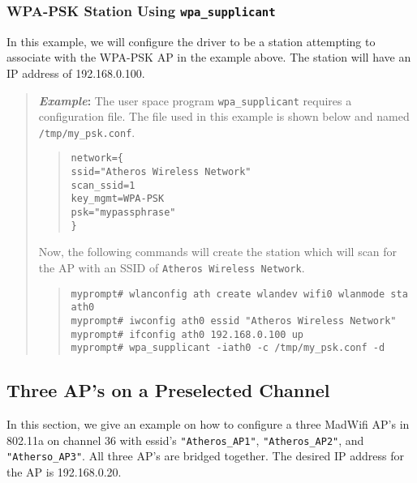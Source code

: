 \documentclass[10pt,fullpage]{article}
\newcommand{\mytt}[1]{{\texttt{#1}}}
\newcommand{\bv}{\begin{verse}}
\newcommand{\ev}{\end{verse}}
\newcommand{\cmd}[1]{{\texttt{myprompt\# #1}}}
\newenvironment{example}{\begin{quote}\textbf{\textit{Example}:}}{\end{quote}}
\begin{document}
\subsubsection{WPA-PSK Station Using \mytt{wpa\_supplicant}}
In this example, we will configure the driver to be a station
attempting to associate with the WPA-PSK AP in the example above.  The
station will have an IP address of 192.168.0.100.
\begin{example}
  The user space program \mytt{wpa\_supplicant} requires a
  configuration file.  The file used in this example is shown below
  and named \mytt{/tmp/my\_psk.conf}.
  \bv
  \mytt{network=\{}\\
  \mytt{\hspace{30pt}ssid="Atheros Wireless Network"}\\
  \mytt{\hspace{30pt}scan\_ssid=1}\\
  \mytt{\hspace{30pt}key\_mgmt=WPA-PSK}\\
  \mytt{\hspace{30pt}psk="mypassphrase"}\\
  \mytt{\}}
  \ev
  Now, the following commands will create the station which will scan
  for the AP with an SSID of \mytt{Atheros Wireless Network}.
  \bv
  \cmd{wlanconfig ath create wlandev wifi0 wlanmode sta}\\
  \mytt{ath0}\\
  \cmd{iwconfig ath0 essid "Atheros Wireless Network"}\\
  \cmd{ifconfig ath0 192.168.0.100 up}\\
  \cmd{wpa\_supplicant -iath0 -c /tmp/my\_psk.conf -d}
  \ev
\end{example}

\subsection{Three AP's on a Preselected Channel}
In this section, we give an example on how to configure a three
MadWifi AP's in 802.11a on channel 36 with essid's
\mytt{"Atheros\_AP1"}, \mytt{"Atheros\_AP2"}, and
\mytt{"Atherso\_AP3"}. All three AP's are bridged together.  The
desired IP address for the AP is 192.168.0.20.
\end{document}
